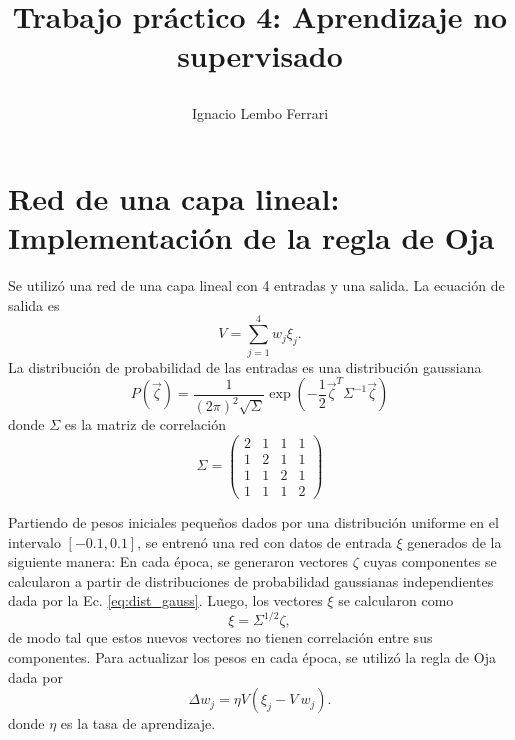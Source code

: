 \documentclass[11pt,twocolumn,twoside]{opticajnl}
\title{
\vspace{0.1cm} 

Trabajo práctico 4: Aprendizaje no supervisado}
\author[1]{\huge{Ignacio Lembo Ferrari}}
\affil[1]{\large{ignaciolembo@ib.edu.ar} 

\vspace{0.1cm}

{\datesfont 31 de octubre de 2023.}

\vspace{0.1cm}
}
\begin{document}
\maketitle

\section{Red de una capa lineal: Implementación de la regla de Oja \label{sec:ej1}}

\vspace{0.3cm}

Se utilizó una red de una capa lineal con 4 entradas y una salida. La ecuación de salida es
\begin{equation}
    V = \sum_{j=1}^{4} w_j \xi_j.
\end{equation}
La distribución de probabilidad de las entradas es una distribución gaussiana
\begin{equation}
    P(\vec{\zeta}) = \frac{1}{(2\pi)^2 \sqrt{\Sigma}} \exp(-\frac{1}{2} \vec{\zeta}^T \Sigma^{-1} \vec{\zeta})
    \label{eq:dist_gauss}
\end{equation}
donde $\Sigma$ es la matriz de correlación 
\begin{equation}
    \Sigma = \begin{pmatrix}
        2 & 1 & 1 & 1 \\ 
        1 & 2 & 1 & 1 \\
        1 & 1 & 2 & 1 \\
        1 & 1 & 1 & 2
    \end{pmatrix}
\end{equation}

Partiendo de pesos iniciales pequeños dados por una distribución uniforme en el intervalo $[-0.1,0.1]$, se entrenó una red con datos de entrada $\xi$ generados de la siguiente manera: En cada época, se generaron vectores $\zeta$ cuyas componentes se calcularon a partir de distribuciones de probabilidad gaussianas independientes dada por la Ec. \ref{eq:dist_gauss}. Luego, los vectores $\xi$ se calcularon como
\begin{equation}
    \xi = \Sigma^{1/2} \zeta,
\end{equation}  
de modo tal que estos nuevos vectores no tienen correlación entre sus componentes. Para actualizar los pesos en cada época, se utilizó la regla de Oja dada por 
\begin{equation}
    \Delta w_{j} = \eta V (\xi_j - V~w_j).
\end{equation}
donde $\eta$ es la tasa de aprendizaje.
\end{document}
